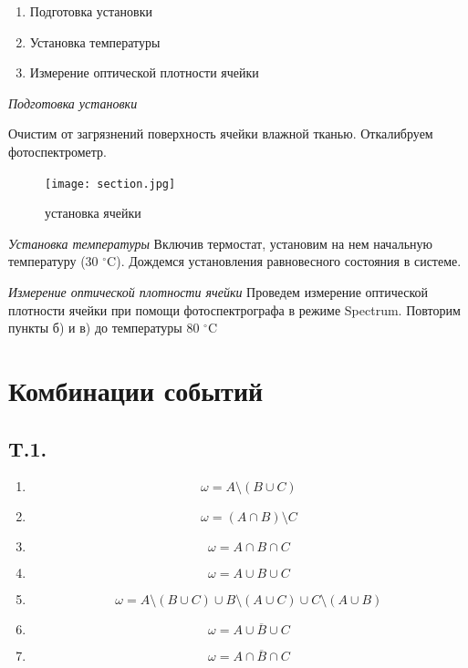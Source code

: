 \documentclass[a4paper,12pt]{article} %
\begin{document}
\begin{enumerate}
	\item Подготовка установки
	\item Установка температуры
	\item Измерение оптической плотности ячейки
	
\end{enumerate}


\emph{Подготовка установки}

Очистим от загрязнений поверхность ячейки влажной тканью. Откалибруем фотоспектрометр.


\begin{figure}
	\texttt{[image: section.jpg]}
	\caption{установка ячейки}
\end{figure}

\emph{Установка температуры}
Включив термостат, установим на нем начальную температуру (30 $^\circ$C). Дождемся установления равновесного состояния в системе.

\emph{Измерение оптической плотности ячейки}
Проведем измерение оптической плотности ячейки при помощи фотоспектрографа в режиме Spectrum. Повторим пункты б) и в) до температуры 80 $^\circ$C









































\newpage
\section{Комбинации событий}
\subsection{T.1.}
\begin{enumerate}
\item
\[\omega = A \setminus (B \cup C)\]
\item 
\[\omega = (A \cap B) \setminus C \]
\item
\[\omega = A \cap B \cap C\]
\item
\[\omega = A \cup B \cup C\]
\item
\[\omega = A \setminus (B \cup C) \cup B \setminus (A \cup C) \cup
C \setminus (A \cup B) \]
\item
\[\omega = \overline{A \cup B \cup C}\]
\item
\[\omega = \overline{A \cap B \cap C} \]
\end{enumerate}
\end{document}
